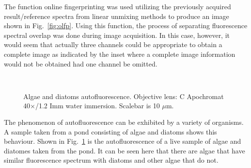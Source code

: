 The function online fingerprinting was used utilizing the previously acquired result/reference spectra from linear unmixing methods to produce an image shown in Fig.~\ref{fig:olfp}. 
Using this function, the process of separating fluorescence spectral overlap was done during image acquisition. 
In this case, however, it would seem that actually three channels could be appropriate to obtain a complete image as indicated by the inset where a complete image information would not be obtained had one channel be omitted.

\begin{figure}[h!]
\centering
{}\hspace{0.1em}
\hspace{0.1em}
\\
\caption{Algae and diatoms autofluorescence. 
Objective lens: C Apochromat 40$\times$/1.2 Imm water immersion. 
Scalebar is 10 $\mu$m.}
\label{fig:diatalg}
\end{figure}

The phenomenon of autofluorescence can be exhibited by a variety of organisms. 
A sample taken from a pond consisting of algae and diatoms shows this behaviour. 
Shown in Fig.~\ref{fig:diatalg} is the autofluorescence of a live sample of algae and diatomes taken from the pond. 
It can be seen here that there are algae that have similar fluorescence spectrum with diatoms and other algae that do not.

